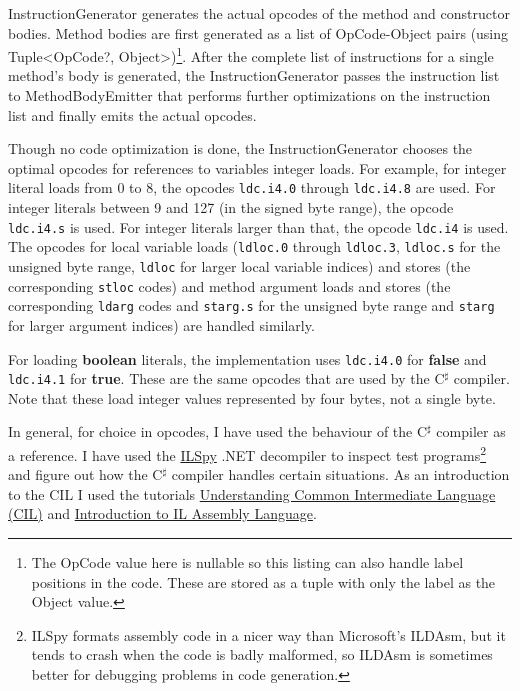 \documentclass[a4paper,11pt]{article}
\begin{document}
InstructionGenerator generates the actual opcodes of the method and constructor bodies. Method bodies are first generated as a list of OpCode-Object pairs (using Tuple<OpCode?, Object>)\footnote{The OpCode value here is nullable so this listing can also handle label positions in the code. These are stored as a tuple with only the label as the Object value.}. After the complete list of instructions for a single method's body is generated, the InstructionGenerator passes the instruction list to MethodBodyEmitter that performs further optimizations on the instruction list and finally emits the actual opcodes.

Though no code optimization is done, the InstructionGenerator chooses the optimal opcodes for references to variables integer loads. For example, for integer literal loads from 0 to 8, the opcodes \verb,ldc.i4.0, through \verb,ldc.i4.8, are used. For integer literals between 9 and 127 (in the signed byte range), the opcode \verb,ldc.i4.s, is used. For integer literals larger than that, the opcode \verb,ldc.i4, is used. The opcodes for local variable loads (\verb,ldloc.0, through \verb,ldloc.3,, \verb,ldloc.s, for the unsigned byte range, \verb,ldloc, for larger local variable indices) and stores (the corresponding \verb,stloc, codes) and method argument loads and stores (the corresponding \verb,ldarg, codes and \verb,starg.s, for the unsigned byte range and \verb,starg, for larger argument indices) are handled similarly.

For loading \textbf{boolean} literals, the implementation uses \verb,ldc.i4.0, for \textbf{false} and \verb,ldc.i4.1, for \textbf{true}. These are the same opcodes that are used by the C$^\sharp$ compiler. Note that these load integer values represented by four bytes, not a single byte.

In general, for choice in opcodes, I have used the behaviour of the C$^\sharp$ compiler as a reference. I have used the \href{http://ilspy.net/}{ILSpy} .NET decompiler to inspect test programs\footnote{ILSpy formats assembly code in a nicer way than Microsoft's ILDAsm, but it tends to crash when the code is badly malformed, so ILDAsm is sometimes better for debugging problems in code generation.} and figure out how the C$^\sharp$ compiler handles certain situations. As an introduction to the CIL I used the tutorials \href{http://www.codeproject.com/Articles/362076/Understanding-Common-Intermediate-Language-CIL}{Understanding Common Intermediate Language (CIL)} and \href{http://www.codeproject.com/Articles/3778/Introduction-to-IL-Assembly-Language}{Introduction to IL Assembly Language}.
\end{document}
